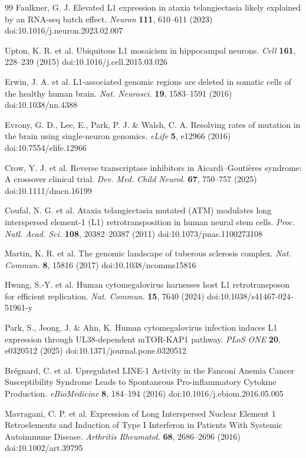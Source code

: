 \documentclass[11pt,twocolumn,twoside]{extarticle}
\begin{document}
\begin{thebibliography}{99}
 Faulkner, G. J. Elevated L1 expression in ataxia telangiectasia likely explained by an RNA-seq batch effect. \textit{Neuron} \textbf{111}, 610--611 (2023) doi:10.1016/j.neuron.2023.02.007

 Upton, K. R. et al. Ubiquitous L1 mosaicism in hippocampal neurons. \textit{Cell} \textbf{161}, 228--239 (2015) doi:10.1016/j.cell.2015.03.026

 Erwin, J. A. et al. L1-associated genomic regions are deleted in somatic cells of the healthy human brain. \textit{Nat. Neurosci.} \textbf{19}, 1583--1591 (2016) doi:10.1038/nn.4388

 Evrony, G. D., Lee, E., Park, P. J. \& Walsh, C. A. Resolving rates of mutation in the brain using single-neuron genomics. \textit{eLife} \textbf{5}, e12966 (2016) doi:10.7554/elife.12966

 Crow, Y. J. et al. Reverse transcriptase inhibitors in Aicardi--Gouti\`eres syndrome: A crossover clinical trial. \textit{Dev. Med. Child Neurol.} \textbf{67}, 750--757 (2025) doi:10.1111/dmcn.16199

 Coufal, N. G. et al. Ataxia telangiectasia mutated (ATM) modulates long interspersed element-1 (L1) retrotransposition in human neural stem cells. \textit{Proc. Natl. Acad. Sci.} \textbf{108}, 20382--20387 (2011) doi:10.1073/pnas.1100273108

 Martin, K. R. et al. The genomic landscape of tuberous sclerosis complex. \textit{Nat. Commun.} \textbf{8}, 15816 (2017) doi:10.1038/ncomms15816

 Hwang, S.-Y. et al. Human cytomegalovirus harnesses host L1 retrotransposon for efficient replication. \textit{Nat. Commun.} \textbf{15}, 7640 (2024) doi:10.1038/s41467-024-51961-y

 Park, S., Jeong, J. \& Ahn, K. Human cytomegalovirus infection induces L1 expression through UL38-dependent mTOR-KAP1 pathway. \textit{PLoS ONE} \textbf{20}, e0320512 (2025) doi:10.1371/journal.pone.0320512

 Br\'egnard, C. et al. Upregulated LINE-1 Activity in the Fanconi Anemia Cancer Susceptibility Syndrome Leads to Spontaneous Pro-inflammatory Cytokine Production. \textit{eBioMedicine} \textbf{8}, 184--194 (2016) doi:10.1016/j.ebiom.2016.05.005

 Mavragani, C. P. et al. Expression of Long Interspersed Nuclear Element 1 Retroelements and Induction of Type I Interferon in Patients With Systemic Autoimmune Disease. \textit{Arthritis Rheumatol.} \textbf{68}, 2686--2696 (2016) doi:10.1002/art.39795


\end{thebibliography}
\end{document}

